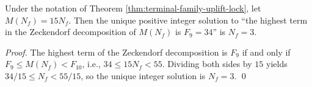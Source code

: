 \begin{corollary}[Uniqueness of Three Generations Locked by the \texorpdfstring{$\delta=34$}{delta=34} Branch]\label{cor:window6-delta-lock-unique-three-families}
Under the notation of Theorem \ref{thm:terminal-family-uplift-lock}, let \(M(N_f)=15N_f\).
Then the unique positive integer solution to ``the highest term in the Zeckendorf decomposition of \(M(N_f)\) is \(F_9=34\)'' is \(N_f=3\).
\end{corollary}
\begin{proof}
The highest term of the Zeckendorf decomposition is \(F_9\) if and only if \(F_9\le M(N_f)<F_{10}\), i.e.,
\(
34\le 15N_f<55
\).
Dividing both sides by \(15\) yields \(34/15\le N_f<55/15\), so the unique integer solution is \(N_f=3\). \qed
\end{proof}


